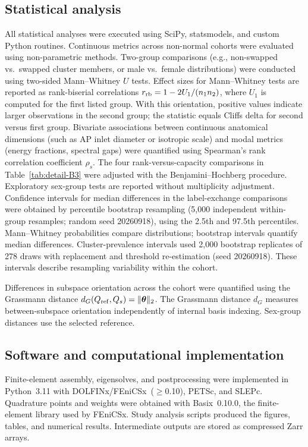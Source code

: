 \documentclass[pdflatex,sn-basic]{sn-jnl}
\begin{document}
\subsection{Statistical analysis}
\label{sec:statistics}

All statistical analyses were executed using SciPy, statsmodels, and custom Python routines.
Continuous metrics across non-normal cohorts were evaluated using non-parametric methods.
Two-group comparisons (e.g., non-swapped vs.\ swapped cluster members, or male vs.\ female distributions) were conducted using two-sided Mann--Whitney $U$ tests.
Effect sizes for Mann--Whitney tests are reported as rank-biserial correlations $r_{\rm rb}=1-2U_1/(n_1n_2)$, where $U_1$ is computed for the first listed group. With this orientation, positive values indicate larger observations in the second group; the statistic equals Cliff\textquotesingle s delta for second versus first group.
Bivariate associations between continuous anatomical dimensions (such as AP inlet diameter or isotropic scale) and modal metrics (energy fractions, spectral gaps) were quantified using Spearman's rank correlation coefficient $\rho_s$.
The four rank-versus-capacity comparisons in Table~\ref{tab:detail-B3} were adjusted with the Benjamini--Hochberg procedure. Exploratory sex-group tests are reported without multiplicity adjustment.
Confidence intervals for median differences in the label-exchange comparisons were obtained by percentile bootstrap resampling (5,000 independent within-group resamples; random seed 20260918), using the 2.5th and 97.5th percentiles. Mann--Whitney probabilities compare distributions; bootstrap intervals quantify median differences.
Cluster-prevalence intervals used 2,000 bootstrap replicates of 278 draws with replacement and threshold re-estimation (seed 20260918). These intervals describe resampling variability within the cohort.

Differences in subspace orientation across the cohort were quantified using the Grassmann distance $d_G(Q_{\rm ref}, Q_s) = \|\boldsymbol\theta\|_2$.
The Grassmann distance $d_G$ measures between-subspace orientation independently of internal basis indexing. Sex-group distances use the selected reference.

\subsection{Software and computational implementation}


Finite-element assembly, eigensolves, and postprocessing were implemented in Python~3.11 with DOLFINx/FEniCSx~($\ge$0.10), PETSc, and SLEPc. Quadrature points and weights were obtained with Basix~0.10.0, the finite-element library used by FEniCSx.
Study analysis scripts produced the figures, tables, and numerical results. Intermediate outputs are stored as compressed Zarr arrays.
\end{document}
